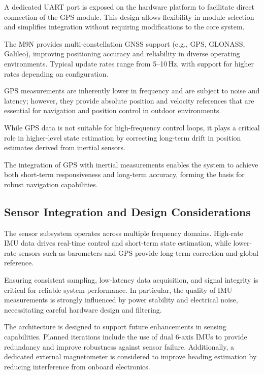 A dedicated UART port is exposed on the hardware platform to facilitate direct connection of the GPS module. This design allows flexibility in module selection and simplifies integration without requiring modifications to the core system.

The M9N provides multi-constellation GNSS support (e.g., GPS, GLONASS, Galileo), improving positioning accuracy and reliability in diverse operating environments. Typical update rates range from 5--10\,Hz, with support for higher rates depending on configuration.

GPS measurements are inherently lower in frequency and are subject to noise and latency; however, they provide absolute position and velocity references that are essential for navigation and position control in outdoor environments.

While GPS data is not suitable for high-frequency control loops, it plays a critical role in higher-level state estimation by correcting long-term drift in position estimates derived from inertial sensors.

The integration of GPS with inertial measurements enables the system to achieve both short-term responsiveness and long-term accuracy, forming the basis for robust navigation capabilities.

\subsection{Sensor Integration and Design Considerations}

The sensor subsystem operates across multiple frequency domains. High-rate IMU data drives real-time control and short-term state estimation, while lower-rate sensors such as barometers and GPS provide long-term correction and global reference.

Ensuring consistent sampling, low-latency data acquisition, and signal integrity is critical for reliable system performance. In particular, the quality of IMU measurements is strongly influenced by power stability and electrical noise, necessitating careful hardware design and filtering.

The architecture is designed to support future enhancements in sensing capabilities. Planned iterations include the use of dual 6-axis IMUs to provide redundancy and improve robustness against sensor failure. Additionally, a dedicated external magnetometer is considered to improve heading estimation by reducing interference from onboard electronics.

